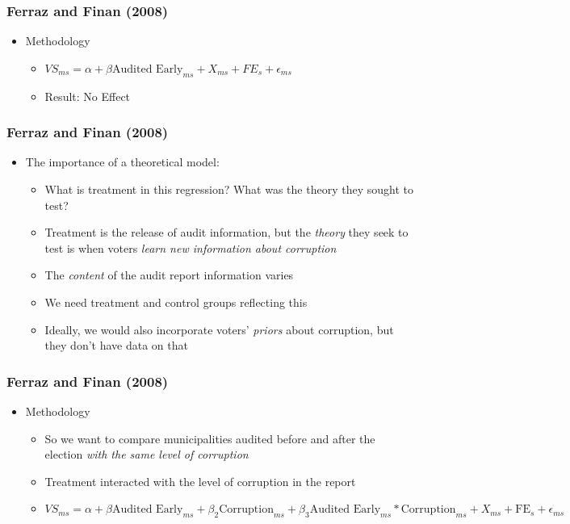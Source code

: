 \documentclass[xcolor=x11names,compress]{beamer}\usepackage[]{graphicx}\usepackage[]{color}
\renewcommand{\(}{\begin{columns}}
\renewcommand{\)}{\end{columns}}
\newcommand{\<}[1]{\begin{column}{#1}}
\renewcommand{\>}{\end{column}}
\begin{document}
\begin{frame}
\frametitle{Ferraz and Finan (2008)}
\begin{itemize}
\item Methodology
\begin{itemize}
\item $VS_{ms} = \alpha + \beta \text{Audited Early}_{ms} + X_{ms} + FE_{s} + \epsilon_{ms}$
\pause
\item Result: No Effect
\end{itemize}
\end{itemize}
\end{frame}

\begin{frame}
\frametitle{Ferraz and Finan (2008)}
\begin{itemize}
\item The importance of a theoretical model:
\begin{itemize}
\item What is treatment in this regression? What was the theory they sought to test?
\pause
\item Treatment is the release of audit information, but the \textit{theory} they seek to test is when voters \textit{learn new information about corruption}
\pause
\item The \textit{content} of the audit report information varies
\pause
\item We need treatment and control groups reflecting this
\pause
\item Ideally, we would also incorporate voters' \textit{priors} about corruption, but they don't have data on that
\end{itemize}
\end{itemize}
\end{frame}

\begin{frame}
\frametitle{Ferraz and Finan (2008)}
\begin{itemize}
\item Methodology
\begin{itemize}
\item So we want to compare municipalities audited before and after the election \textit{with the same level of corruption}
\pause
\item Treatment interacted with the level of corruption in the report
\pause
\item $VS_{ms} = \alpha + \beta \text{Audited Early}_{ms} + \beta_2 \text{Corruption}_{ms} + \beta_3 \text{Audited Early}_{ms}*\text{Corruption}_{ms} + X_{ms} + \text{FE}_{s} + \epsilon_{ms}$
\end{itemize}
\end{itemize}
\end{frame}
\end{document}
